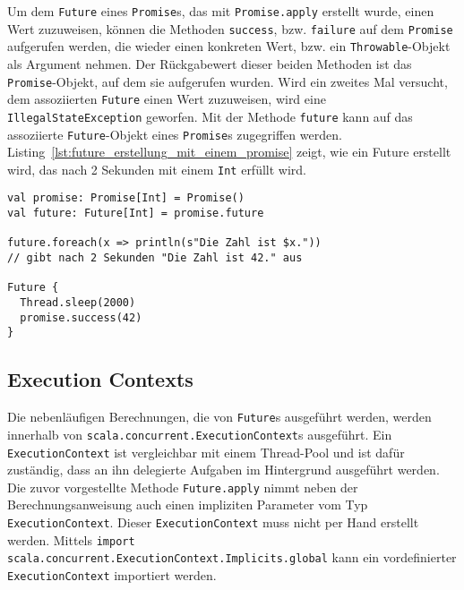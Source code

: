 Um dem \lstinline|Future| eines \lstinline|Promise|s, das mit \lstinline|Promise.apply| erstellt wurde, einen Wert zuzuweisen, können die Methoden \lstinline|success|, bzw. \lstinline|failure| auf dem \lstinline|Promise| aufgerufen werden, die wieder einen konkreten Wert, bzw. ein \lstinline|Throwable|-Objekt als Argument nehmen.
Der Rückgabewert dieser beiden Methoden ist das \lstinline|Promise|-Objekt, auf dem sie aufgerufen wurden.
Wird ein zweites Mal versucht, dem assoziierten \lstinline|Future| einen Wert zuzuweisen, wird eine \lstinline|IllegalStateException| geworfen.
Mit der Methode \lstinline|future| kann auf das assoziierte \lstinline|Future|-Objekt eines \lstinline|Promise|s zugegriffen werden.
Listing~\ref{lst:future_erstellung_mit_einem_promise} zeigt, wie ein Future erstellt wird, das nach 2 Sekunden mit einem \lstinline|Int| erfüllt wird.

\begin{lstlisting}[caption=Future-Erstellung mit einem Promise, label=lst:future_erstellung_mit_einem_promise]
val promise: Promise[Int] = Promise()
val future: Future[Int] = promise.future

future.foreach(x => println(s"Die Zahl ist $x."))
// gibt nach 2 Sekunden "Die Zahl ist 42." aus

Future {
  Thread.sleep(2000)
  promise.success(42)
}
\end{lstlisting}


\subsection{Execution Contexts} %
\label{sub:execution_contexts}

Die nebenläufigen Berechnungen, die von \lstinline|Future|s ausgeführt werden, werden innerhalb von \lstinline|scala.concurrent.ExecutionContext|s ausgeführt.
Ein \lstinline|ExecutionContext| ist vergleichbar mit einem Thread-Pool und ist dafür zuständig, dass an ihn delegierte Aufgaben im Hintergrund ausgeführt werden.
Die zuvor vorgestellte Methode \lstinline|Future.apply| nimmt neben der Berechnungsanweisung auch einen impliziten Parameter vom Typ \lstinline|ExecutionContext|.
Dieser \lstinline|ExecutionContext| muss nicht per Hand erstellt werden.
Mittels \lstinline|import scala.concurrent.ExecutionContext.Implicits.global| kann ein vordefinierter \lstinline|ExecutionContext| importiert werden.


